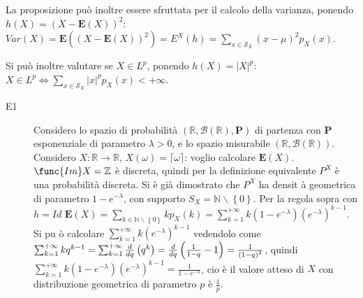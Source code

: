 \documentclass{article}
\begin{document}
La proposizione pu\`{o} inoltre essere sfruttata per il calcolo della
varianza, ponendo $h\left( X\right) =\left( X-\mathbf{E}\left( X\right)
\right) ^{2}$: $Var\left( X\right) =\mathbf{E}\left( \left( X-\mathbf{E}%
\left( X\right) \right) ^{2}\right) =E^{X}\left( h\right) =\sum_{x\in 
\mathcal{S}_{X}}\left( x-\mu \right) ^{2}p_{X}\left( x\right) $.

Si pu\`{o} inoltre valutare se $X\in L^{p}$, ponendo $h\left( X\right)
=\left\vert X\right\vert ^{p}$: $X\in L^{p}\Longleftrightarrow \sum_{x\in 
\mathcal{S}_{X}}\left\vert x\right\vert ^{p}p_{X}\left( x\right) <+\infty $.

\begin{description}
\item[E1] Considero lo spazio di probabilit\`{a} $\left( 
\mathbb{R}
,\mathcal{B}\left( 
\mathbb{R}
\right) ,\mathbf{P}\right) $ di partenza con $\mathbf{P}$ esponenziale di
parametro $\lambda >0$, e lo spazio misurabile $\left( 
\mathbb{R}
,\mathcal{B}\left( 
\mathbb{R}
\right) \right) $. Considero $X:%
\mathbb{R}
\rightarrow 
\mathbb{R}
$, $X\left( \omega \right) =\lceil \omega \rceil $: voglio calcolare $%
\mathbf{E}\left( X\right) $. $\func{Im}X=%
\mathbb{Z}
$ \`{e} discreta, quindi per la definizione equivalente $P^{X}$ \`{e} una
probabilit\`{a} discreta. Si \`{e} gi\`{a} dimostrato che $P^{X}$ ha densit%
\`{a} geometrica di parametro $1-e^{-\lambda }$, con supporto $S_{X}=%
\mathbb{N}
\backslash \left\{ 0\right\} $. Per la regola sopra con $h=Id$ $\mathbf{E}%
\left( X\right) =\sum_{k\in 
\mathbb{N}
\backslash \left\{ 0\right\} }kp_{X}\left( k\right) =\sum_{k=1}^{+\infty
}k\left( 1-e^{-\lambda }\right) \left( e^{-\lambda }\right) ^{k-1}$. Si pu%
\`{o} calcolare $\sum_{k=1}^{+\infty }k\left( e^{-\lambda }\right) ^{k-1}$
vedendolo come $\sum_{k=1}^{+\infty }kq^{k-1}=\sum_{k=1}^{+\infty }\frac{d}{%
dq}\left( q^{k}\right) =\frac{d}{dq}\left( \frac{1}{1-q}-1\right) =\frac{1}{%
\left( 1-q\right) ^{2}}$, quindi $\sum_{k=1}^{+\infty }k\left( 1-e^{-\lambda
}\right) \left( e^{-\lambda }\right) ^{k-1}=\frac{1}{1-e^{-\lambda }}$, cio%
\`{e} il valore atteso di $X$ con distribuzione geometrica di parametro $p$ 
\`{e} $\frac{1}{p}$.


\end{description}
\end{document}
